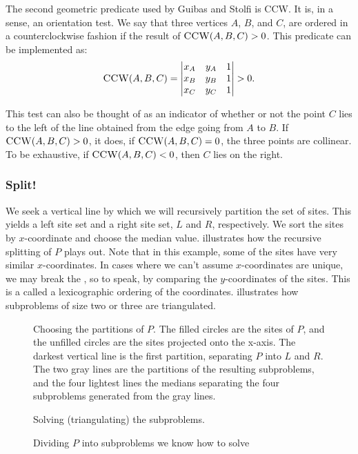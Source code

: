\documentclass[12pt,twoside]{reedthesis}
\begin{document}
    The second geometric predicate used by Guibas and Stolfi is \textsc{CCW}. It is, in a sense, an orientation test. We say that three vertices $A$, $B$, and $C$, are ordered in a counterclockwise fashion if the result of $\textsc{CCW}(A, B, C) > 0$. This predicate can be implemented as:
    $$
    \textsc{CCW}(A,B,C) =
    \begin{vmatrix}
    x_{A} & y_{A} & 1 \\
    x_{B} & y_{B} & 1 \\
    x_{C} & y_{C} & 1 \\  
    \end{vmatrix} > 0.
    $$  

    This test can also be thought of as an indicator of whether or not the point $C$ lies to the left of the line obtained from the edge going from $A$ to $B$. If $\textsc{CCW}(A,B,C) > 0$, it does, if $\textsc{CCW}(A,B,C) = 0$, the three points are collinear. To be exhaustive, if $\textsc{CCW}(A,B,C) < 0$, then $C$ lies on the right. 


  \subsubsection{Split!}
  \label{ssub:split}
    We seek a vertical line by which we will recursively partition the set of sites. This yields a left site set and a right site set, $L$ and $R$, respectively. We sort the sites by $x$-coordinate and choose the median value.  illustrates how the recursive splitting of $P$ plays out. Note that in this example, some of the sites have very similar $x$-coordinates. In cases where we can't assume $x$-coordinates are unique, we may break the , so to speak, by comparing the $y$-coordinates of the sites. This is a called a lexicographic ordering of the coordinates.  illustrates how subproblems of size two or three are triangulated. \par

    \begin{figure}[!htb]
    \centering
      \begin{subtable}{\textwidth}
        \centering
        
        \caption{Choosing the partitions of $P$. The filled circles are the sites of $P$, and the unfilled circles are the sites projected onto the x-axis. The darkest vertical line is the first partition, separating $P$ into $L$ and $R$. The two gray lines are the partitions of the resulting subproblems, and the four lightest lines the medians separating the four subproblems generated from the gray lines.}
        \label{fig:del_partition0}
      \end{subtable}

      \begin{subtable}{\textwidth}
        \centering
        
        \caption{Solving (triangulating) the subproblems.}
        \label{fig:del_partition1}
      \end{subtable}
      \caption{Dividing $P$ into subproblems we know how to solve}
      \label{fig:div_and_triangulate}
    \end{figure}
\end{document}
